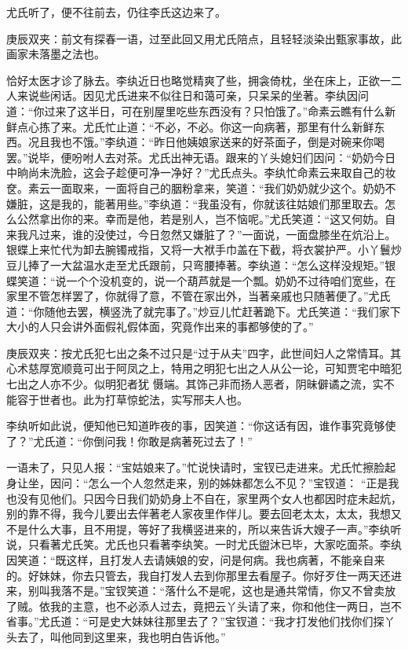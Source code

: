 \begin{parag}
    尤氏听了，便不往前去，仍往李氏这边来了。\begin{note}庚辰双夹：前文有探春一语，过至此回又用尤氏陪点，且轻轻淡染出甄家事故，此画家未落墨之法也。\end{note}恰好太医才诊了脉去。李纨近日也略觉精爽了些，拥衾倚枕，坐在床上，正欲一二人来说些闲话。因见尤氏进来不似往日和蔼可亲，只呆呆的坐著。李纨因问道：“你过来了这半日，可在别屋里吃些东西没有？只怕饿了。”命素云瞧有什么新鲜点心拣了来。尤氏忙止道：“不必，不必。你这一向病著，那里有什么新鲜东西。况且我也不饿。”李纨道：“昨日他姨娘家送来的好茶面子，倒是对碗来你喝罢。”说毕，便吩咐人去对茶。尤氏出神无语。跟来的丫头媳妇们因问：“奶奶今日中晌尚未洗脸，这会子趁便可净一净好？”尤氏点头。李纨忙命素云来取自己的妆奁。素云一面取来，一面将自己的胭粉拿来，笑道：“我们奶奶就少这个。奶奶不嫌脏，这是我的，能著用些。”李纨道：“我虽没有，你就该往姑娘们那里取去。怎么公然拿出你的来。幸而是他，若是别人，岂不恼呢。”尤氏笑道：“这又何妨。自来我凡过来，谁的没使过，今日忽然又嫌脏了？”一面说，一面盘膝坐在炕沿上。银蝶上来忙代为卸去腕镯戒指，又将一大袱手巾盖在下截，将衣裳护严。小丫鬟炒豆儿捧了一大盆温水走至尤氏跟前，只弯腰捧著。李纨道：“怎么这样没规矩。”银蝶笑道：“说一个个没机变的，说一个葫芦就是一个瓢。奶奶不过待咱们宽些，在家里不管怎样罢了，你就得了意，不管在家出外，当著亲戚也只随著便了。”尤氏道：“你随他去罢，横竖洗了就完事了。”炒豆儿忙赶著跪下。尤氏笑道：“我们家下大小的人只会讲外面假礼假体面，究竟作出来的事都够使的了。”\begin{note}庚辰双夹：按尤氏犯七出之条不过只是“过于从夫”四字，此世间妇人之常情耳。其心术慈厚宽顺竟可出于阿凤之上，特用之明犯七出之人从公一论，可知贾宅中暗犯七出之人亦不少。似明犯者犹 慑端。其饰己非而扬人恶者，阴昧僻谲之流，实不能容于世者也。此为打草惊蛇法，实写邢夫人也。\end{note}李纨听如此说，便知他已知道昨夜的事，因笑道：“你这话有因，谁作事究竟够使了？”尤氏道：“你倒问我！你敢是病著死过去了！”
\end{parag}


\begin{parag}
    一语未了，只见人报：“宝姑娘来了。”忙说快请时，宝钗已走进来。尤氏忙擦脸起身让坐，因问：“怎么一个人忽然走来，别的姊妹都怎么不见？”宝钗道： “正是我也没有见他们。只因今日我们奶奶身上不自在，家里两个女人也都因时症未起炕，别的靠不得，我今儿要出去伴著老人家夜里作伴儿。要去回老太太，太太，我想又不是什么大事，且不用提，等好了我横竖进来的，所以来告诉大嫂子一声。”李纨听说，只看著尤氏笑。尤氏也只看著李纨笑。一时尤氏盥沐已毕，大家吃面茶。李纨因笑道：“既这样，且打发人去请姨娘的安，问是何病。我也病著，不能亲自来的。好妹妹，你去只管去，我自打发人去到你那里去看屋子。你好歹住一两天还进来，别叫我落不是。”宝钗笑道：“落什么不是呢，这也是通共常情，你又不曾卖放了贼。依我的主意，也不必添人过去，竟把云丫头请了来，你和他住一两日，岂不省事。”尤氏道：“可是史大妹妹往那里去了？”宝钗道：“我才打发他们找你们探丫头去了，叫他同到这里来，我也明白告诉他。”
\end{parag}


